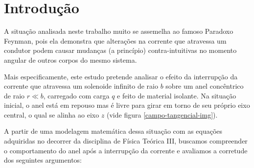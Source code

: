 \documentclass[
	article,
	11pt,
	oneside,
	a4paper,
	english,
	brazil,
	sumario=tradicional
	]{abntex2}
\begin{document}
\frenchspacing


\textual
\section{Introdução}

A situação analisada neste trabalho muito se assemelha ao famoso Paradoxo Feynman, pois ela demonstra que alterações na corrente que atravessa um condutor podem causar mudanças (a princípio) contra-intuitivas no momento angular de outros corpos do mesmo sistema.

Mais especificamente, este estudo pretende analisar o efeito da interrupção da corrente que atravessa um solenoide infinito de raio $b$ sobre um anel concêntrico de raio $r \ll b$, carregado com carga $q$ e feito de material isolante. Na situação inicial, o anel está em repouso mas é livre para girar em torno de seu próprio eixo central, o qual se alinha ao eixo $z$ (vide figura \ref{campo-tangencial-img}).

A partir de uma modelagem matemática dessa situação com as equações adquiridas no decorrer da disciplina de Física Teórica III, buscamos compreender o comportamento do anel após a interrupção da corrente e avaliamos a corretude dos seguintes argumentos:
\end{document}
